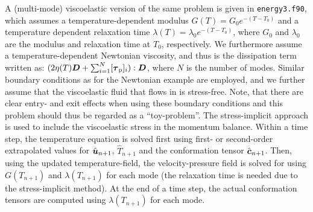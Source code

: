 A (multi-mode) viscoelastic version of the same problem is given in 
\texttt{energy3.f90}, which assumes a 
temperature-dependent modulus $G(T)=G_0 e^{-(T-T_0)}$ and a temperature 
dependent relaxation time $\lambda(T)=\lambda_0 e^{-(T-T_0)}$, where $G_0$ and 
$\lambda_0$ are the modulus and relaxation time at $T_0$, respectively. We 
furthermore assume a temperature-dependent Newtonian 
viscosity, and thus is the dissipation term written as: $(2\eta(T) \boldsymbol{D}+ 
\sum_{i=1}^N [\boldsymbol{\tau}_\text{p}]_i):\boldsymbol{D}$, where $N$ is the number 
of modes. Similar boundary conditions as for the Newtonian 
example are employed, and we further assume that the viscoelastic fluid that 
flows in is 
stress-free. Note, that there are clear entry- and exit effects when using 
these boundary conditions and this problem should thus be regarded as a 
``toy-problem''. The stress-implicit approach is used to include the 
viscoelastic stress in the momentum balance.
Within a time step, the temperature equation is solved first using  
first- or  second-order extrapolated values for 
$\hat{\boldsymbol{u}}_{n+1}$, $\hat{T}_{n+1}$ and the conformation tensor $\hat{\boldsymbol{c}}_{n+1}$. Then, using the updated temperature-field, the 
velocity-pressure field is solved for using $G(T_{n+1})$ and 
$\lambda(T_{n+1})$ for each mode (the relaxation time 
is needed due to the stress-implicit method). At the end of a time step, the 
actual conformation tensors are computed using $\lambda(T_{n+1})$ for each mode.
